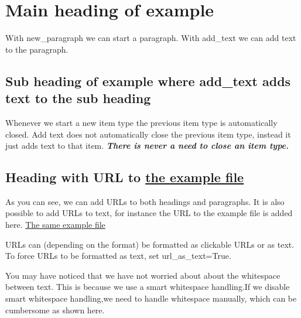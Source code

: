 \documentclass[a4paper]{report}
\begin{document}
\chapter{Main heading of example}

With new\_paragraph we can start a paragraph. With add\_text we can add text to the paragraph.

\section{Sub heading of example where add\_text adds text to the sub heading}

Whenever we start a new item type the previous item type is automatically closed. Add text does not automatically close the previous item type, instead it just adds text to that item.\textit{\textbf{ There is never a need to close an item type.}}

\section{Heading with URL to \href{https://github.com/tom-bjorkholm/mformat/blob/master/example/src/e50\_simple\_complete.py}{the example file}}

As you can see, we can add URLs to both headings and paragraphs. It is also possible to add URLs to text, for instance the URL to the example file is added here. \href{https://github.com/tom-bjorkholm/mformat/blob/master/example/src/e50\_simple\_complete.py}{The same example file}

URLs can (depending on the format) be formatted as clickable URLs or as text. To force URLs to be formatted as text, set url\_as\_text=True.

You may have noticed that we have not worried about about the whitespace between text. This is because we use a smart whitespace handling.If we disable smart whitespace handling,we need to handle whitespace manually,  which can be cumbersome as shown here.
\end{document}
